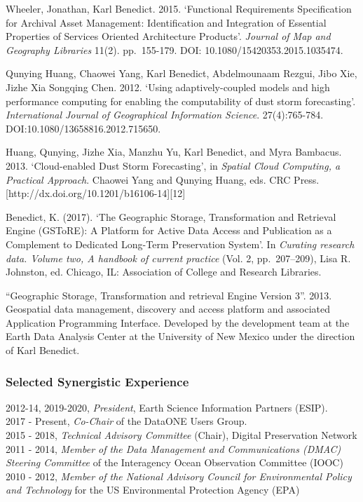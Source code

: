 \documentclass[]{article}
\begin{document}
Wheeler, Jonathan, Karl Benedict. 2015. `Functional Requirements
Specification for Archival Asset Management: Identification and
Integration of Essential Properties of Services Oriented Architecture
Products'. \emph{Journal of Map and Geography Libraries} 11(2).
pp.~155-179. DOI: 10.1080/15420353.2015.1035474.

Qunying Huang, Chaowei Yang, Karl Benedict, Abdelmounaam Rezgui, Jibo
Xie, Jizhe Xia Songqing Chen. 2012. `Using adaptively-coupled models and
high performance computing for enabling the computability of dust storm
forecasting'. \emph{International Journal of Geographical Information
Science}. 27(4):765-784. DOI:10.1080/13658816.2012.715650.

Huang, Qunying, Jizhe Xia, Manzhu Yu, Karl Benedict, and Myra Bambacus.
2013. `Cloud-enabled Dust Storm Forecasting', in \emph{Spatial Cloud
Computing, a Practical Approach}. Chaowei Yang and Qunying Huang, eds.
CRC Press. {[}http://dx.doi.org/10.1201/b16106-14{]}{[}12{]}

Benedict, K. (2017). `The Geographic Storage, Transformation and
Retrieval Engine (GSToRE): A Platform for Active Data Access and
Publication as a Complement to Dedicated Long-Term Preservation System'.
In \emph{Curating research data. Volume two, A handbook of current
practice} (Vol. 2, pp.~207--209), Lisa R. Johnston, ed. Chicago, IL:
Association of College and Research Libraries.

``Geographic Storage, Transformation and retrieval Engine Version 3''.
2013. Geospatial data management, discovery and access platform and
associated Application Programming Interface. Developed by the
development team at the Earth Data Analysis Center at the University of
New Mexico under the direction of Karl Benedict.

\hypertarget{selected-synergistic-experience}{%
\subsubsection{Selected Synergistic
Experience}\label{selected-synergistic-experience}}

2012-14, 2019-2020, \emph{President}, Earth Science Information Partners
(ESIP).\\
2017 - Present, \emph{Co-Chair} of the DataONE Users Group.\\
2015 - 2018, \emph{Technical Advisory Committee} (Chair), Digital
Preservation Network\\
2011 - 2014, \emph{Member of the Data Management and Communications
(DMAC) Steering Committee} of the Interagency Ocean Observation
Committee (IOOC)\\
2010 - 2012, \emph{Member of the National Advisory Council for
Environmental Policy and Technology} for the US Environmental Protection
Agency (EPA)
\end{document}
